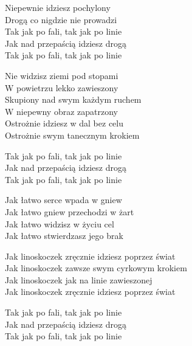 \begin{textn}
    Niepewnie idziesz pochylony\\
    Drogą co nigdzie nie prowadzi\\
    Tak jak po fali, tak jak po linie\\
    Jak nad przepaścią idziesz drogą\\
    Tak jak po fali, tak jak po linie

    Nie widzisz ziemi pod stopami\\
    W powietrzu lekko zawieszony\\
    Skupiony nad swym każdym ruchem\\
    W niepewny obraz zapatrzony\\
    Ostrożnie idziesz w dal bez celu\\
    Ostrożnie swym tanecznym krokiem

    Tak jak po fali, tak jak po linie\\
    Jak nad przepaścią idziesz drogą\\
    Tak jak po fali, tak jak po linie

    Jak łatwo serce wpada w gniew\\
    Jak łatwo gniew przechodzi w żart\\
    Jak łatwo widzisz w życiu cel\\
    Jak łatwo stwierdzasz jego brak

    Jak linoskoczek zręcznie idziesz poprzez świat\\
    Jak linoskoczek zawsze swym cyrkowym krokiem\\
    Jak linoskoczek jak na linie zawieszonej\\
    Jak linoskoczek zręcznie idziesz poprzez świat

    Tak jak po fali, tak jak po linie\\
    Jak nad przepaścią idziesz drogą\\
    Tak jak po fali, tak jak po linie
\end{textn}
